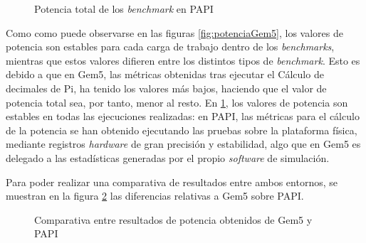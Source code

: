 \begin{figure}[H]
    \centering
    \caption{Potencia total de los \textit{benchmark} en PAPI}
    \label{fig:potenciaPAPI}
\end{figure}

Como como puede observarse en las figuras \ref{fig:potenciaGem5}, los valores de potencia son estables para cada carga de trabajo dentro de los \textit{benchmarks}, mientras que estos valores difieren entre los distintos tipos de \textit{benchmark}. Esto es debido a que en Gem5, las métricas obtenidas tras ejecutar el Cálculo de decimales de Pi, ha tenido los valores más bajos, haciendo que el valor de potencia total sea, por tanto, menor al resto. En \ref{fig:potenciaPAPI}, los valores de potencia son estables en todas las ejecuciones realizadas: en PAPI, las métricas para el cálculo de la potencia se han obtenido ejecutando las pruebas sobre la plataforma física, mediante registros \textit{hardware} de gran precisión y estabilidad, algo que en Gem5 es delegado a las estadísticas generadas por el propio \textit{software} de simulación.

Para poder realizar una comparativa de resultados entre ambos entornos, se muestran en la figura \ref{fig:diferenciaPotenciaGem5PAPI} las diferencias relativas a Gem5 sobre PAPI.

\begin{figure}[H]
    \centering
    \caption{Comparativa entre resultados de potencia obtenidos de Gem5 y PAPI}
    \label{fig:diferenciaPotenciaGem5PAPI}
\end{figure}

